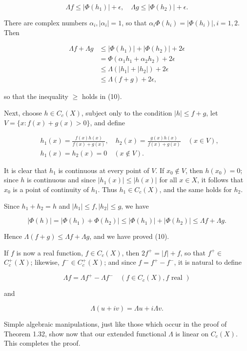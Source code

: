 \documentclass[10pt]{article}
\begin{document}
$$
\Lambda f \leq\left|\Phi\left(h_{1}\right)\right|+\epsilon, \quad \Lambda g \leq\left|\Phi\left(h_{2}\right)\right|+\epsilon .
$$

There are complex numbers $\alpha_{i},\left|\alpha_{i}\right|=1$, so that $\alpha_{i} \Phi\left(h_{i}\right)=\left|\Phi\left(h_{i}\right)\right|, i=1,2$. Then

$$
\begin{aligned}
\Lambda f+\Lambda g & \leq\left|\Phi\left(h_{1}\right)\right|+\left|\Phi\left(h_{2}\right)\right|+2 \epsilon \\
& =\Phi\left(\alpha_{1} h_{1}+\alpha_{2} h_{2}\right)+2 \epsilon \\
& \leq \Lambda\left(\left|h_{1}\right|+\left|h_{2}\right|\right)+2 \epsilon \\
& \leq \Lambda(f+g)+2 \epsilon,
\end{aligned}
$$

so that the inequality $\geq$ holds in (10).

Next, choose $h \in C_{c}(X)$, subject only to the condition $|h| \leq f+g$, let $V=\{x: f(x)+g(x)>0\}$, and define

$$
\begin{aligned}
& h_{1}(x)=\frac{f(x) h(x)}{f(x)+g(x)}, \quad h_{2}(x)=\frac{g(x) h(x)}{f(x)+g(x)} \quad(x \in V), \\
& h_{1}(x)=h_{2}(x)=0 \quad(x \notin V) .
\end{aligned}
$$

It is clear that $h_{1}$ is continuous at every point of $V$. If $x_{0} \notin V$, then $h\left(x_{0}\right)=0$; since $h$ is continuous and since $\left|h_{1}(x)\right| \leq|h(x)|$ for all $x \in X$, it follows that $x_{0}$ is a point of continuity of $h_{1}$. Thus $h_{1} \in C_{c}(X)$, and the same holds for $h_{2}$.

Since $h_{1}+h_{2}=h$ and $\left|h_{1}\right| \leq f,\left|h_{2}\right| \leq g$, we have

$$
|\Phi(h)|=\left|\Phi\left(h_{1}\right)+\Phi\left(h_{2}\right)\right| \leq\left|\Phi\left(h_{1}\right)\right|+\left|\Phi\left(h_{2}\right)\right| \leq \Lambda f+\Lambda g .
$$

Hence $\Lambda(f+g) \leq \Lambda f+\Lambda g$, and we have proved (10).

If $f$ is now a real function, $f \in C_{c}(X)$, then $2 f^{+}=|f|+f$, so that $f^{+} \in$ $C_{c}^{+}(X)$; likewise, $f^{-} \in C_{c}^{+}(X)$; and since $f=f^{+}-f^{-}$, it is natural to define

$$
\Lambda f=\Lambda f^{+}-\Lambda f^{-} \quad\left(f \in C_{c}(X), f \text { real }\right)
$$

and

$$
\Lambda(u+i v)=\Lambda u+i \Lambda v .
$$

Simple algebraic manipulations, just like those which occur in the proof of Theorem 1.32, show now that our extended functional $\Lambda$ is linear on $C_{c}(X)$. This completes the proof.
\end{document}
